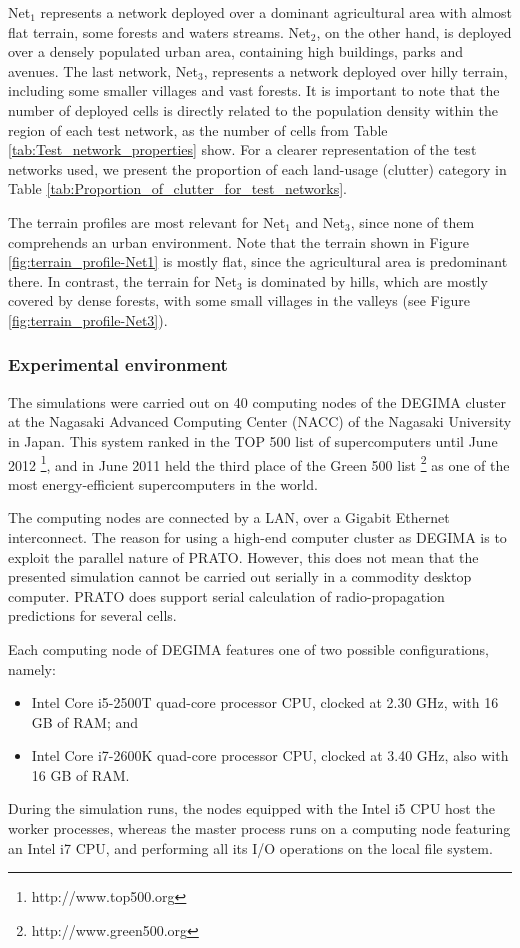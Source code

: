 Net$_{1}$ represents a network deployed over a dominant agricultural
area with almost flat terrain, some forests and waters streams. Net$_{2}$,
on the other hand, is deployed over a densely populated urban area,
containing high buildings, parks and avenues. The last network, Net$_{3}$,
represents a network deployed over hilly terrain, including some smaller
villages and vast forests. It is important to note that the number
of deployed cells is directly related to the population density within
the region of each test network, as the number of cells from Table
\ref{tab:Test_network_properties} show. For a clearer representation
of the test networks used, we present the proportion of each land-usage
(clutter) category in Table \ref{tab:Proportion_of_clutter_for_test_networks}.

The terrain profiles are most relevant for Net$_{1}$ and Net$_{3}$,
since none of them comprehends an urban environment. Note that the
terrain shown in Figure \ref{fig:terrain_profile-Net1} is mostly
flat, since the agricultural area is predominant there. In contrast,
the terrain for Net$_{3}$ is dominated by hills, which are mostly
covered by dense forests, with some small villages in the valleys
(see Figure \ref{fig:terrain_profile-Net3}).


\subsubsection{Experimental environment}

The simulations were carried out on 40 computing nodes of the DEGIMA
cluster \cite{Hamada_Cluster_of_GPUs:2010} at the Nagasaki Advanced
Computing Center (NACC) of the Nagasaki University in Japan. This
system ranked in the TOP 500 list of supercomputers until June 2012%
\footnote{http://www.top500.org%
}, and in June 2011 held the third place of the Green 500 list%
\footnote{http://www.green500.org%
} as one of the most energy-efficient supercomputers in the world.

The computing nodes are connected by a LAN, over a Gigabit Ethernet
interconnect. The reason for using a high-end computer cluster as
DEGIMA is to exploit the parallel nature of PRATO. However, this does
not mean that the presented simulation cannot be carried out serially
in a commodity desktop computer. PRATO does support serial calculation
of radio-propagation predictions for several cells.

Each computing node of DEGIMA features one of two possible configurations,
namely:
\begin{itemize}
\item Intel Core i5-2500T quad-core processor CPU, clocked at 2.30 GHz,
with 16 GB of RAM; and
\item Intel Core i7-2600K quad-core processor CPU, clocked at 3.40 GHz,
also with 16 GB of RAM.
\end{itemize}
During the simulation runs, the nodes equipped with the Intel i5 CPU
host the worker processes, whereas the master process runs on a computing
node featuring an Intel i7 CPU, and performing all its I/O operations
on the local file system.


